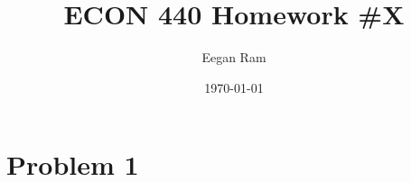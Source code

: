 \documentclass{scrartcl}
\title{ECON 440 Homework \#X}
\author{Eegan Ram}
\date{\today}
\begin{document}
\maketitle

\section{Problem 1}
\end{document}
